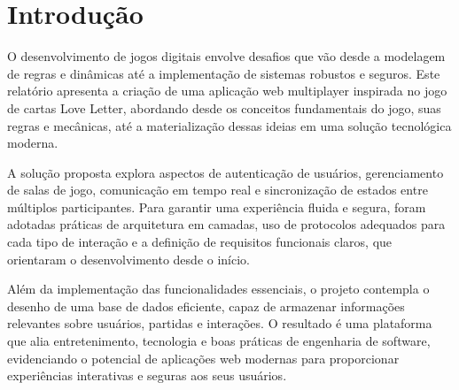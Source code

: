 \chapter{Introdução}

O desenvolvimento de jogos digitais envolve desafios que vão desde a modelagem de regras e dinâmicas até a implementação de sistemas robustos e seguros. Este relatório apresenta a criação de uma aplicação web multiplayer inspirada no jogo de cartas Love Letter, abordando desde os conceitos fundamentais do jogo, suas regras e mecânicas, até a materialização dessas ideias em uma solução tecnológica moderna.

A solução proposta explora aspectos de autenticação de usuários, gerenciamento de salas de jogo, comunicação em tempo real e sincronização de estados entre múltiplos participantes. Para garantir uma experiência fluida e segura, foram adotadas práticas de arquitetura em camadas, uso de protocolos adequados para cada tipo de interação e a definição de requisitos funcionais claros, que orientaram o desenvolvimento desde o início.

Além da implementação das funcionalidades essenciais, o projeto contempla o desenho de uma base de dados eficiente, capaz de armazenar informações relevantes sobre usuários, partidas e interações. O resultado é uma plataforma que alia entretenimento, tecnologia e boas práticas de engenharia de software, evidenciando o potencial de aplicações web modernas para proporcionar experiências interativas e seguras aos seus usuários.
